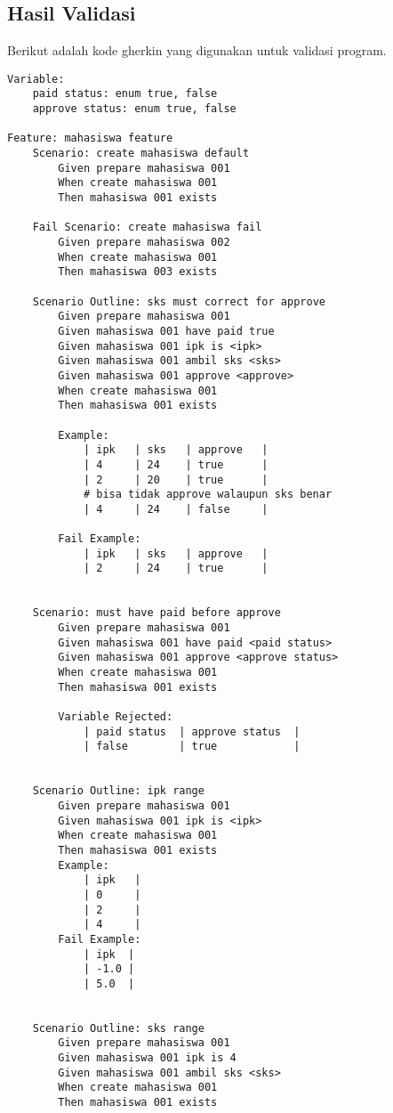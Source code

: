 \subsection{Hasil Validasi}

Berikut adalah kode gherkin yang digunakan untuk validasi program.

\begin{lstlisting}[language=gherkin]
Variable:
    paid status: enum true, false
    approve status: enum true, false

Feature: mahasiswa feature
    Scenario: create mahasiswa default
        Given prepare mahasiswa 001
        When create mahasiswa 001
        Then mahasiswa 001 exists
    
    Fail Scenario: create mahasiswa fail
        Given prepare mahasiswa 002
        When create mahasiswa 001
        Then mahasiswa 003 exists

    Scenario Outline: sks must correct for approve
        Given prepare mahasiswa 001
        Given mahasiswa 001 have paid true
        Given mahasiswa 001 ipk is <ipk>
        Given mahasiswa 001 ambil sks <sks>
        Given mahasiswa 001 approve <approve>
        When create mahasiswa 001
        Then mahasiswa 001 exists

        Example:
            | ipk   | sks   | approve   |
            | 4     | 24    | true      |
            | 2     | 20    | true      |
            # bisa tidak approve walaupun sks benar
            | 4     | 24    | false     |

        Fail Example:
            | ipk   | sks   | approve   |
            | 2     | 24    | true      |


    Scenario: must have paid before approve
        Given prepare mahasiswa 001
        Given mahasiswa 001 have paid <paid status>
        Given mahasiswa 001 approve <approve status>
        When create mahasiswa 001
        Then mahasiswa 001 exists

        Variable Rejected:
            | paid status  | approve status  |
            | false        | true            |


    Scenario Outline: ipk range
        Given prepare mahasiswa 001
        Given mahasiswa 001 ipk is <ipk>
        When create mahasiswa 001
        Then mahasiswa 001 exists
        Example:
            | ipk   |
            | 0     |
            | 2     |
            | 4     |
        Fail Example:
            | ipk  |
            | -1.0 |
            | 5.0  |

    
    Scenario Outline: sks range
        Given prepare mahasiswa 001
        Given mahasiswa 001 ipk is 4
        Given mahasiswa 001 ambil sks <sks>
        When create mahasiswa 001
        Then mahasiswa 001 exists


\end{lstlisting}
